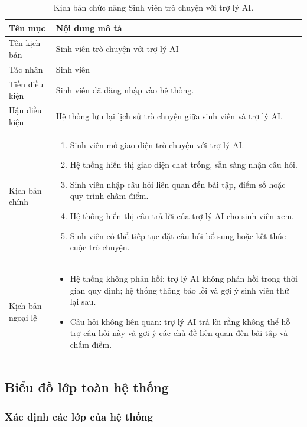 \documentclass[../BTL.tex]{subfiles}
\begin{document}
\begin{table}[H]
\centering
\begin{tabularx}{\textwidth}{|p{3.2cm}|X|}
\hline
Tên mục & Nội dung mô tả \\ \hline
Tên kịch bản & Sinh viên trò chuyện với trợ lý AI \\ \hline
Tác nhân & Sinh viên \\ \hline
Tiền điều kiện & Sinh viên đã đăng nhập vào hệ thống. \\ \hline
Hậu điều kiện & Hệ thống lưu lại lịch sử trò chuyện giữa sinh viên và trợ lý AI. \\ \hline
Kịch bản chính &
\begin{enumerate}[leftmargin=*, nosep]
    \item Sinh viên mở giao diện trò chuyện với trợ lý AI.
    \item Hệ thống hiển thị giao diện chat trống, sẵn sàng nhận câu hỏi.
    \item Sinh viên nhập câu hỏi liên quan đến bài tập, điểm số hoặc quy trình chấm điểm.
    \item Hệ thống hiển thị câu trả lời của trợ lý AI cho sinh viên xem.
    \item Sinh viên có thể tiếp tục đặt câu hỏi bổ sung hoặc kết thúc cuộc trò chuyện.
\end{enumerate} \\ \hline
Kịch bản ngoại lệ &
\begin{itemize}[leftmargin=*, nosep]
    \item Hệ thống không phản hồi: trợ lý AI không phản hồi trong thời gian quy định; hệ thống thông báo lỗi và gợi ý sinh viên thử lại sau.
    \item Câu hỏi không liên quan: trợ lý AI trả lời rằng không thể hỗ trợ câu hỏi này và gợi ý các chủ đề liên quan đến bài tập và chấm điểm.
\end{itemize} \\ \hline
\end{tabularx}
\caption{Kịch bản chức năng Sinh viên trò chuyện với trợ lý AI.}
\label{tab:uc-student-chat-ai}
\end{table}

\subsection{Biểu đồ lớp toàn hệ thống}
\label{sec:system-class-diagram}

\subsubsection{Xác định các lớp của hệ thống}
\end{document}
